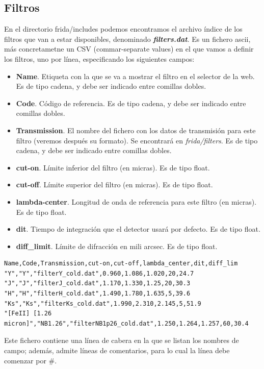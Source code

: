     \subsection{Filtros}
    En el directorio frida/includes podemos encontramos el archivo \'indice de los filtros que van a estar disponibles, denominado \textbf{\textit{filters.dat}}. Es un fichero ascii, m\'as concretametne un CSV (commar-separate values) en el que vamos a definir los filtros, uno por l\'inea, especificando los siguientes campos:
    \begin{itemize}
        \item \textbf{Name}. Etiqueta con la que se va a mostrar el filtro en el selector de la web. Es de tipo cadena, y debe ser indicado entre comillas dobles.
        \item \textbf{Code}. C\'odigo de referencia. Es de tipo cadena, y debe ser indicado entre comillas dobles. 
        \item \textbf{Transmission}. El nombre del fichero con los datos de transmisi\'on para este filtro (veremos despu\'es su formato). Se encontrar\'a en \textit{frida/filters}. Es de tipo cadena, y debe ser indicado entre comillas dobles.
        \item \textbf{cut-on}. L\'imite inferior del filtro (en micras). Es de tipo float.
        \item \textbf{cut-off}. L\'imite superior del filtro (en micras). Es de tipo float.
        \item \textbf{lambda-center}. Longitud de onda de referencia para este filtro (en micras). Es de tipo float.
        \item \textbf{dit}. Tiempo de integraci\'on que el detector usar\'a por defecto. Es de tipo float.
        \item \textbf{diff\_limit}. L\'imite de difracci\'on en mili arcsec. Es de tipo float.
    \end{itemize}

\begin{Verbatim}[fontsize=\scriptsize]
Name,Code,Transmission,cut-on,cut-off,lambda_center,dit,diff_lim
"Y","Y","filterY_cold.dat",0.960,1.086,1.020,20,24.7
"J","J","filterJ_cold.dat",1.170,1.330,1.25,20,30.3
"H","H","filterH_cold.dat",1.490,1.780,1.635,5,39.6
"Ks","Ks","filterKs_cold.dat",1.990,2.310,2.145,5,51.9
"[FeII] [1.26 micron]","NB1.26","filterNB1p26_cold.dat",1.250,1.264,1.257,60,30.4
\end{Verbatim}
    Este fichero contiene una l\'inea de cabera en la que se listan los nombres de campo; adem\'as, admite l\'ineas de comentarios, para lo cual la l\'inea debe comenzar por \#.

